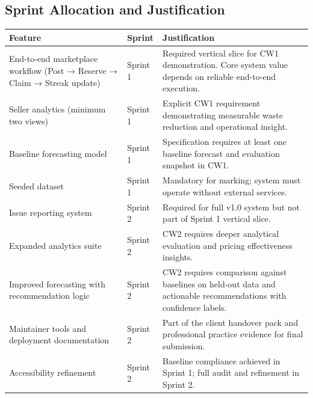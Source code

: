 \documentclass[12pt]{article}
\begin{document}
\FloatBarrier

\clearpage

\subsection{Sprint Allocation and Justification}

\renewcommand{\arraystretch}{1.3}

\begin{table}[H]
\centering
\begin{tabular}{|p{4cm}|p{2cm}|p{8cm}|}
\hline
\textbf{Feature} & \textbf{Sprint} & \textbf{Justification} \\
\hline

End-to-end marketplace workflow (Post → Reserve → Claim → Streak update) &
Sprint 1 &
Required vertical slice for CW1 demonstration. Core system value depends on reliable end-to-end execution. \\
\hline

Seller analytics (minimum two views) &
Sprint 1 &
Explicit CW1 requirement demonstrating measurable waste reduction and operational insight. \\
\hline

Baseline forecasting model &
Sprint 1 &
Specification requires at least one baseline forecast and evaluation snapshot in CW1. \\
\hline

Seeded dataset &
Sprint 1 &
Mandatory for marking; system must operate without external services. \\
\hline

Issue reporting system &
Sprint 2 &
Required for full v1.0 system but not part of Sprint 1 vertical slice. \\
\hline

Expanded analytics suite &
Sprint 2 &
CW2 requires deeper analytical evaluation and pricing effectiveness insights. \\
\hline

Improved forecasting with recommendation logic &
Sprint 2 &
CW2 requires comparison against baselines on held-out data and actionable recommendations with confidence labels. \\
\hline

Maintainer tools and deployment documentation &
Sprint 2 &
Part of the client handover pack and professional practice evidence for final submission. \\
\hline

Accessibility refinement &
Sprint 2 &
Baseline compliance achieved in Sprint 1; full audit and refinement in Sprint 2. \\
\hline


\end{tabular}
\end{table}
\end{document}
